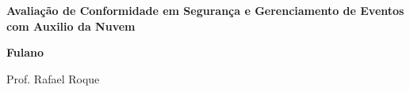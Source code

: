 %
%

\begin{titlepage}

\begin{center}

\small



\vfill

\LARGE

\textbf{
Avaliação de Conformidade em Segurança e Gerenciamento de Eventos com Auxilio da Nuvem
}

\vfill

\Large

\textbf{Fulano}

\vfill

\normalsize

Prof. Rafael Roque

\vfill

\hfill


\vfill

\large



\end{center}

\end{titlepage}
